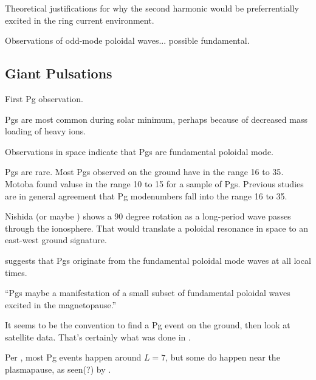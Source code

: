 Theoretical justifications for why the second harmonic would be preferrentially excited in the ring current environment\cite{southwood_1976,chen_1991,cheng_1994,chan_1994}. 

Observations of odd-mode poloidal waves... possible fundamental\cite{yang_2010,eriksson_2005}.

\subsection{Giant Pulsations}

First Pg observation\cite{birkeland_1901}. 

Pgs are most common during solar minimum, perhaps because of decreased mass loading of heavy ions\cite{denton_2011}. 

Observations in space indicate that Pgs are fundamental poloidal mode\cite{kokubun_1980,hillebrand_1982,kokubun_1989,takahashi_1992,glassmeier_1999}. 

Pgs are rare\cite{brekke_1987}. Most Pgs observed on the ground have \azm in the range 16 to 35\cite{takahashi_1992}. Motoba\cite{motoba_2015} found \azm valuse in the range 10 to 15 for a sample of Pgs. Previous studies\cite{rostoker_1979,glassmeier_1980,hillebrand_1982,poulter_1983} are in general agreement that Pg modenumbers fall into the range 16 to 35. 

Nishida\cite{nishida_1964_screening} (or maybe \cite{nishida_1964_impulses}) shows a 90 degree rotation as a long-period \Alfven wave passes through the ionosphere. That would translate a poloidal resonance in space to an east-west ground signature. 

\cite{motoba_2015} suggests that Pgs originate from the fundamental poloidal mode waves at all local times. 

``Pgs maybe a manifestation of a small subset of fundamental poloidal waves excited in the magnetopause.'' \cite{takahashi_2013}

It seems to be the convention to find a Pg event on the ground, then look at satellite data. That's certainly what was done in \cite{motoba_2015}. 

Per \cite{motoba_2015}, most Pg events happen around $L=7$, but some do happen near the plasmapause, as seen(?) by \cite{green_1985}. 

